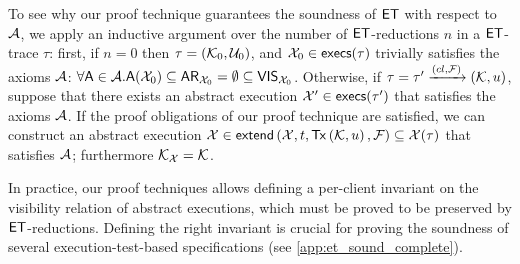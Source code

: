 To see why our proof technique guarantees the soundness of $\mathsf{ET}$ with respect 
to $\mathcal{A}$, we apply an inductive argument over the number of $\mathsf{ET}$-reductions $n$ in a $\mathsf{ET}$-trace $\tau$: 
first, if $n = 0$ then $\tau = (\mathcal{K}_{0}, \mathcal{U}_{0})$, and $\aexec_{0} \in \execs(\tau)$ trivially satisfies the axioms
$\mathcal{A}$: $\forall \mathsf{A} \in \mathcal{A}. \mathsf{A}(\mathcal{X}_{0}) \subseteq \mathsf{AR}_{\mathcal{X}_{0}} = \emptyset \subseteq \mathsf{VIS}_{\mathcal{X}_{0}}$. 
Otherwise, if $\tau = \tau' \xrightarrow{({cl}, \mathcal{F})} (\mathcal{K}, u)$, 
suppose that there exists an abstract execution $\aexec' \in \execs(\tau')$ that satisfies 
the axioms $\mathcal{A}$. If the proof obligations of our proof technique are satisfied, we can construct an abstract execution 
$\aexec \in \extend[\aexec, \txid, \Tx[\hh, \vi], \fp] \subseteq \aexec(\tau)$ that satisfies $\mathcal{A}$; furthermore $\mathcal{K}_{\mathcal{X}} = \mathcal{K}$. 
%

In practice, our proof techniques allows defining a per-client invariant 
on the visibility relation of abstract executions, which must be proved to be preserved by $\mathsf{ET}$-reductions. %
Defining the right invariant is crucial for proving the soundness of several execution-test-based specifications (see \cref{app:et_sound_complete}).


